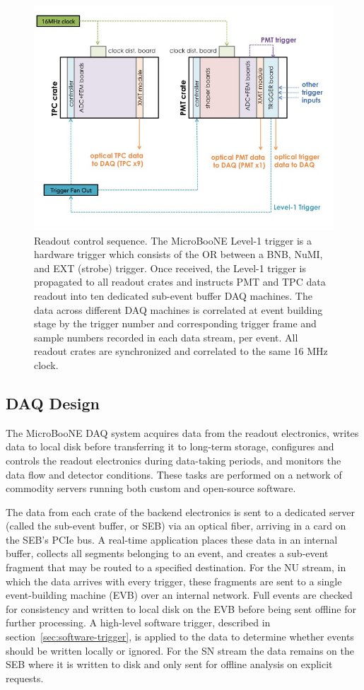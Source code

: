 \begin{figure}
\centering
\includegraphics[width=0.8\linewidth]{./figures/det_figure_10.jpg}%
\caption{\label{fig:readout_10}Readout control sequence. The MicroBooNE Level-1 trigger is a hardware trigger which consists of the OR between a BNB, NuMI, and EXT (strobe) trigger. Once received, the Level-1 trigger is propagated to all readout crates and instructs PMT and TPC data readout into ten dedicated sub-event buffer DAQ machines. The data across different DAQ machines is correlated at event building stage by the trigger number and corresponding trigger frame and sample numbers recorded in each data stream, per event. All readout crates are synchronized and correlated to the same 16 MHz clock.}
\end{figure}

%
\subsection{DAQ Design}
\label{sec:daq}
The MicroBooNE DAQ system acquires data from the readout electronics, writes data to local disk before transferring it to long-term storage, configures and controls the readout electronics during data-taking periods, and monitors the data flow and detector conditions. These tasks are performed on a network of commodity servers running both custom and open-source software.

The data from each crate of the backend electronics is sent to a dedicated server (called the sub-event buffer, or SEB) via an optical fiber, arriving in a card on the SEB's PCIe bus. A real-time application places these data in an internal buffer, collects all segments belonging to an event, and creates a sub-event fragment that may be routed to a specified destination.  For the NU stream, in which the data arrives with every trigger, these fragments are sent to a single event-building machine (EVB) over an internal network. Full events are checked for consistency and written to local disk on the EVB before being sent offline for further processing. A high-level software trigger, described in section~\ref{sec:software-trigger}, is applied to the data to determine whether events should be written locally or ignored. For the SN stream the data remains on the SEB where it is written to disk and only sent for offline analysis on explicit requests.

